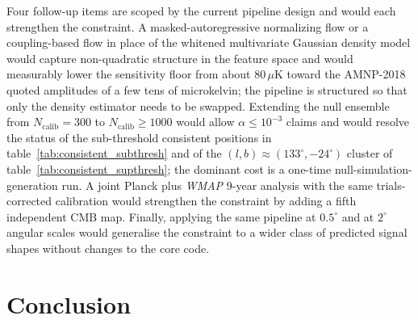 \documentclass[a4paper,11pt]{article}
\begin{document}
Four follow-up items are scoped by the current pipeline design and would each strengthen the constraint. A masked-autoregressive normalizing flow \citep{papamakarios_2017} or a coupling-based flow \citep{dinh_2016} in place of the whitened multivariate Gaussian density model would capture non-quadratic structure in the feature space and would measurably lower the sensitivity floor from about $80\,\mu\mathrm{K}$ toward the AMNP-2018 quoted amplitudes of a few tens of microkelvin; the pipeline is structured so that only the density estimator needs to be swapped. Extending the null ensemble from $N_{\text{calib}} = 300$ to $N_{\text{calib}} \ge 1000$ would allow $\alpha \le 10^{-3}$ claims and would resolve the status of the sub-threshold consistent positions in table~\ref{tab:consistent_subthresh} and of the $(l, b) \approx (133^\circ, -24^\circ)$ cluster of table~\ref{tab:consistent_supthresh}; the dominant cost is a one-time null-simulation-generation run. A joint Planck plus \emph{WMAP} 9-year \citep{bennett_2013} analysis with the same trials-corrected calibration would strengthen the constraint by adding a fifth independent CMB map. Finally, applying the same pipeline at $0.5^\circ$ and at $2^\circ$ angular scales would generalise the constraint to a wider class of predicted signal shapes without changes to the core code.

\section{Conclusion}\label{sec:conclusion}
\end{document}
